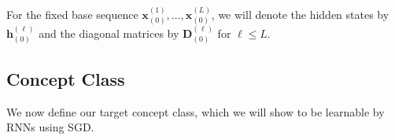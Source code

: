 \begin{definition}
	For the fixed base sequence $\mathbf{x}^{(1)}_{(0)}, \ldots, \mathbf{x}^{(L)}_{(0)}$, we will denote the hidden states by $\mathbf{h}^{(\ell)}_{(0)}$ and the diagonal matrices by $\mathbf{D}^{(\ell)}_{(0)}$ for $\ell \le L$.
	\fi 
\end{definition}


\subsection{Concept Class}
We now define our target concept class, which we will show to be learnable by RNNs using SGD. 

